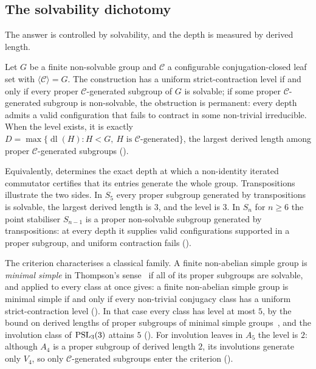 \subsection*{The solvability dichotomy}
The answer is controlled by solvability, and the depth is measured by
derived length.

\begin{lettertheorem}
\label{ithm:A}
Let $G$ be a finite non-solvable group and $\mathcal{C}$ a configurable conjugation-closed
leaf set with $\langle\mathcal{C}\rangle=G$. The construction has a uniform
strict-contraction level if and only if every proper $\mathcal{C}$-generated subgroup of
$G$ is solvable; if some proper $\mathcal{C}$-generated subgroup is non-solvable, the
obstruction is permanent: every depth admits a valid configuration that fails to contract in some non-trivial irreducible. When the level exists, it
is exactly
$D=\max\{\operatorname{dl}(H):H<G,\ H\text{ is }\mathcal{C}\text{-generated}\}$, the
largest derived length among proper $\mathcal{C}$-generated subgroups
\textup{()}.
\end{lettertheorem}

Equivalently,  determines the exact depth at which a
non-identity iterated commutator certifies that its entries generate the
whole group. Transpositions illustrate the two sides. In $S_5$ every
proper subgroup generated by transpositions is solvable, the largest
derived length is $3$, and the level is $3$. In $S_n$ for $n\ge6$ the
point stabiliser $S_{n-1}$ is a proper non-solvable subgroup generated by
transpositions: at every depth it supplies valid configurations supported
in a proper subgroup, and uniform contraction fails ().

The criterion characterises a classical family. A finite non-abelian
simple group is \emph{minimal simple} in Thompson's
sense~\cite{Thompson1968} if all of its proper subgroups are solvable, and
 applied to every class at once gives: a finite non-abelian
simple group is minimal simple if and only if every non-trivial conjugacy
class has a uniform strict-contraction level (). In
that case every class has level at most $5$, by the bound on derived
lengths of proper subgroups of minimal simple
groups~\cite[Remark 2.3]{ErsoyTortoraTota2014}, and the involution class
of $\operatorname{PSL}_3(3)$ attains $5$ (). For involution
leaves in $A_5$ the level is $2$: although $A_4$ is a proper subgroup of
derived length $2$, its involutions generate only $V_4$, so only
$\mathcal C$-generated subgroups enter the criterion ().

